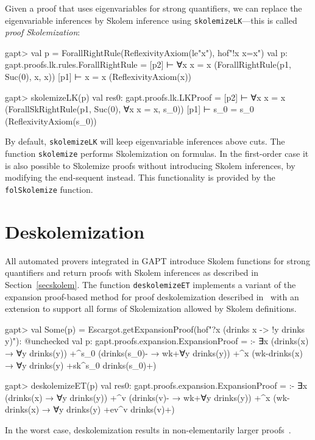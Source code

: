 \documentclass[a4paper,11pt]{book}
\begin{document}
Given a proof that uses eigenvariables for strong quantifiers, we can replace
the eigenvariable inferences by Skolem inference using
\texttt{skolemizeLK}---this is called \emph{proof Skolemization}:
\begin{clilisting}
gapt> val p = ForallRightRule(ReflexivityAxiom(le"x"), hof"!x x=x")
val p: gapt.proofs.lk.rules.ForallRightRule = [p2]  ⊢ ∀x x = x    (ForallRightRule(p1, Suc(0), x, x))
[p1]  ⊢ x = x    (ReflexivityAxiom(x))

gapt> skolemizeLK(p)
val res0: gapt.proofs.lk.LKProof = [p2]  ⊢ ∀x x = x    (ForallSkRightRule(p1, Suc(0), ∀x x = x, s_0))
[p1]  ⊢ s_0 = s_0    (ReflexivityAxiom(s_0))

\end{clilisting}

By default, \texttt{skolemizeLK} will keep eigenvariable inferences above cuts.
The function \texttt{skolemize} performs Skolemization on formulas.
In the first-order case it is also possible to Skolemize proofs without
introducing Skolem inferences, by modifying the end-sequent instead.  This
functionality is provided by the \texttt{folSkolemize} function.

\section{Deskolemization}

All automated provers integrated in GAPT introduce Skolem functions for strong
quantifiers and return proofs with Skolem inferences as described in
Section~\ref{secskolem}.  The function \texttt{deskolemizeET} implements a
variant of the expansion proof-based method for proof deskolemization
described in~\cite{Baaz2012Complexity} with an extension to support all forms
of Skolemization allowed by Skolem definitions.
\begin{clilisting}
gapt> val Some(p) = Escargot.getExpansionProof(hof"?x (drinks x -> !y drinks y)"): @unchecked
val p: gapt.proofs.expansion.ExpansionProof = 
:-
∃x (drinks(x) → ∀y drinks(y))
  +^{s_0} (drinks(s_0)- → wk+{∀y drinks(y)})
  +^{x} (wk-{drinks(x)} → ∀y drinks(y) +sk^{s_0} drinks(s_0)+)

gapt> deskolemizeET(p)
val res0: gapt.proofs.expansion.ExpansionProof = 
:-
∃x (drinks(x) → ∀y drinks(y))
  +^{v} (drinks(v)- → wk+{∀y drinks(y)})
  +^{x} (wk-{drinks(x)} → ∀y drinks(y) +ev^{v} drinks(v)+)

\end{clilisting}

In the worst case, deskolemization results in non-elementarily larger
proofs~\cite{Aguilera2016Unsound}.
\end{document}

